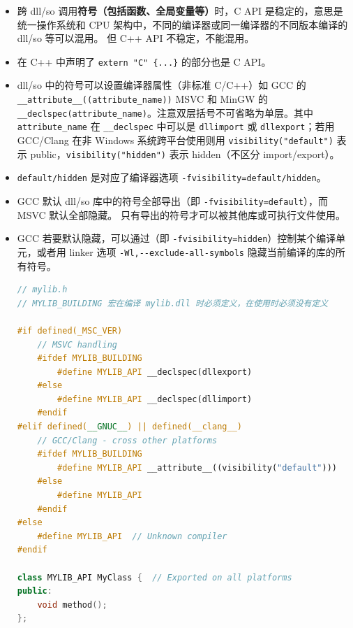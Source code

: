 

\begin{itemize}
\item 跨 dll/so 调用\textbf{符号（包括函数、全局变量等）}时，C API 是稳定的，意思是统一操作系统和 CPU 架构中，不同的编译器或同一编译器的不同版本编译的 dll/so 等可以混用。 但 C++ API 不稳定，不能混用。
\item 在 C++ 中声明了 \verb`extern "C" {...}` 的部分也是 C API。
\item dll/so 中的符号可以设置编译器属性（非标准 C/C++）如 GCC 的 \verb`__attribute__((attribute_name))` MSVC 和 MinGW 的 \verb`__declspec(attribute_name)`。注意双层括号不可省略为单层。其中 \verb`attribute_name` 在 \verb`__declspec` 中可以是 \verb`dllimport` 或 \verb`dllexport`；若用 GCC/Clang 在非 Windows 系统跨平台使用则用 \verb`visibility("default")` 表示 public，\verb`visibility("hidden")` 表示 hidden（不区分 import/export）。
\item \verb`default/hidden` 是对应了编译器选项 \verb`-fvisibility=default/hidden`。
\item GCC 默认 dll/so 库中的符号全部导出（即 \verb`-fvisibility=default`），而 MSVC 默认全部隐藏。 只有导出的符号才可以被其他库或可执行文件使用。
\item GCC 若要默认隐藏，可以通过（即 \verb`-fvisibility=hidden`）控制某个编译单元，或者用 linker 选项 \verb`-Wl,--exclude-all-symbols` 隐藏当前编译的库的所有符号。
\begin{lstlisting}[language=cpp]
// mylib.h
// MYLIB_BUILDING 宏在编译 mylib.dll 时必须定义，在使用时必须没有定义

#if defined(_MSC_VER)
    // MSVC handling
    #ifdef MYLIB_BUILDING
        #define MYLIB_API __declspec(dllexport)
    #else
        #define MYLIB_API __declspec(dllimport)
    #endif
#elif defined(__GNUC__) || defined(__clang__)
    // GCC/Clang - cross other platforms
    #ifdef MYLIB_BUILDING
        #define MYLIB_API __attribute__((visibility("default")))
    #else
        #define MYLIB_API
    #endif
#else
    #define MYLIB_API  // Unknown compiler
#endif

class MYLIB_API MyClass {  // Exported on all platforms
public:
    void method();
};
\end{lstlisting}
\end{itemize}
